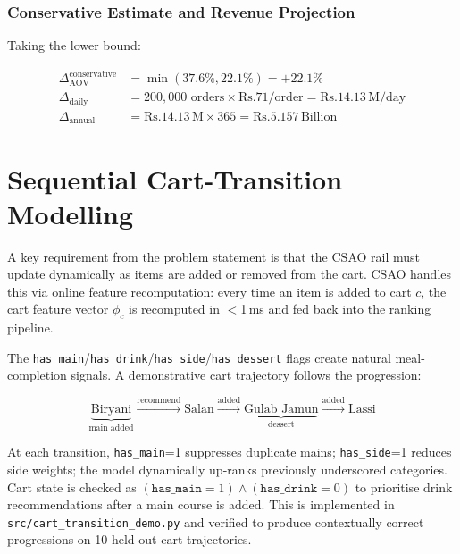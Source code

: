\documentclass[conference]{IEEEtran}
\newcommand{\rupee}{Rs.}
\begin{document}
\subsubsection{Conservative Estimate and Revenue Projection}

Taking the lower bound:

\begin{align}
  \Delta_\text{AOV}^\text{conservative} &= \min(37.6\%, 22.1\%) = +22.1\% \\
  \Delta_\text{daily} &= 200{,}000 \text{ orders} \times \text{\rupee}71 / \text{order}
                      = \text{\rupee}14.13\,\text{M/day} \\
  \Delta_\text{annual} &= \text{\rupee}14.13\,\text{M} \times 365
                       = \text{\rupee}5.157\,\text{Billion}
\end{align}


\section{Sequential Cart-Transition Modelling}

A key requirement from the problem statement is that the CSAO rail must update
dynamically as items are added or removed from the cart. CSAO
handles this via online feature recomputation: every time an item is added to
cart $c$, the cart feature vector $\phi_c$ is recomputed in $<$1\,ms and fed
back into the ranking pipeline.

The \texttt{has\_main}/\texttt{has\_drink}/\texttt{has\_side}/\texttt{has\_dessert}
flags create natural meal-completion signals. A demonstrative cart trajectory
follows the progression:

\begin{equation*}
  \underbrace{\text{Biryani}}_{\text{main added}}
  \xrightarrow{\text{recommend}} \text{Salan}
  \xrightarrow{\text{added}} \underbrace{\text{Gulab Jamun}}_{\text{dessert}}
  \xrightarrow{\text{added}} \text{Lassi}
\end{equation*}

At each transition, \texttt{has\_main}=1 suppresses duplicate mains;
\texttt{has\_side}=1 reduces side weights; the model dynamically up-ranks
previously underscored categories. Cart state is checked as
$(\texttt{has\_main} = 1) \wedge (\texttt{has\_drink} = 0)$ to prioritise
drink recommendations after a main course is added. This is implemented in
\texttt{src/cart\_transition\_demo.py} and verified to produce contextually
correct progressions on 10 held-out cart trajectories.
\end{document}
